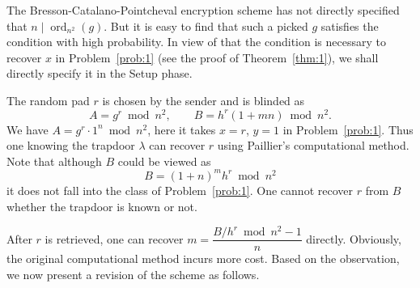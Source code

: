 \documentclass[11pt,a4paper]{article}
\theoremstyle{remark}
\newcommand{\ord}{\operatorname{ord}}
\begin{document}
The Bresson-Catalano-Pointcheval encryption scheme has not directly specified that $n\mid\ord_{n^2}(g)$. But it is easy to find that such a picked $g$ satisfies the condition with high probability. In view of that the condition is necessary to recover $x$ in Problem~\ref{prob:1} (see the proof of Theorem~\ref{thm:1}), we shall directly specify it in the Setup phase.

The random pad $r$ is chosen by the sender and is blinded as
\[
A = g^r \bmod n^2, \qquad B = h^r(1+mn) \bmod n^2.
\]
We have $A = g^r \cdot 1^n \bmod n^2$, here it takes $x=r$, $y=1$ in Problem~\ref{prob:1}. Thus one knowing the trapdoor $\lambda$ can recover $r$ using Paillier's computational method. Note that although $B$ could be viewed as
\[
B = (1+n)^m h^r \bmod n^2
\]
it does not fall into the class of Problem~\ref{prob:1}. One cannot recover $r$ from $B$ whether the trapdoor is known or not.

After $r$ is retrieved, one can recover $m = \dfrac{B/h^r \bmod n^2 - 1}{n}$ directly. Obviously, the original computational method incurs more cost. Based on the observation, we now present a revision of the scheme as follows.
\end{document}
